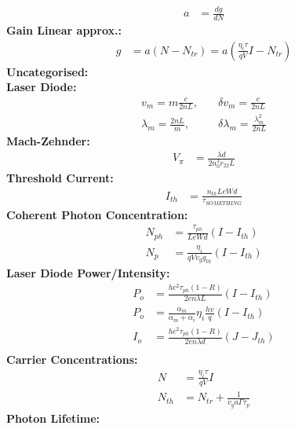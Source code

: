 \documentclass[landscape,a4paper,8pt]{article}
\begin{document}
\begin{multicols}{4}
\begin{align}
		a &= \frac{dg}{dN}
	\end{align}
	\hspace{3mm}\textbf{Gain Linear approx.:}
	\begin{align}
		g &= a(N - N_{tr}) = a\left( \frac{\eta_i\tau}{qV}I - N_{tr} \right)
	\end{align}
	\textbf{Uncategorised:}\\
	\hspace{3mm}\textbf{Laser Diode:}
	\begin{align}
		v_m = m\frac{c}{2nL},&\quad\delta v_m = \frac{c}{2nL}\\
		\lambda_m = \frac{2nL}{m},&\quad\delta\lambda_m = \frac{\lambda_m^2}{2nL}
	\end{align}
	\hspace{3mm}\textbf{Mach-Zehnder:}
	\begin{align}
		V_\pi &= \frac{\lambda d}{2 n_0^3 r_{22} L}
	\end{align}
	\hspace{3mm}\textbf{Threshold Current:}
	\begin{align}
		I_{th} &= \frac{n_{th} LeWd}{\tau_{SOMETHING}}
	\end{align}%
	\hspace{3mm}\textbf{Coherent Photon Concentration:}
	\begin{align}
		N_{ph} &= \frac{\tau_{ph}}{LeWd} (I - I_{th})\\
		N_p &= \frac{\eta_i}{qVv_g g_{th}} (I - I_{th})
	\end{align}
	\hspace{3mm}\textbf{Laser Diode Power/Intensity:}
	\begin{align}
		P_o &= \frac{hc^2 \tau_{ph} (1 - R)}{2en\lambda L}(I - I_{th})\\%
		P_o &= \frac{\alpha_m}{\alpha_m + \alpha_i} \eta_i \frac{hv}{q} (I - I_{th})\\
		I_o &= \frac{hc^2 \tau_{ph} (1 - R)}{2en\lambda d}(J - J_{th})\\%
	\end{align}
	\hspace{3mm}\textbf{Carrier Concentrations:}
	\begin{align}
		N &= \frac{\eta_i \tau}{qV}I\\
		N_{th} &= N_{tr} + \frac{1}{v_g a \Gamma \tau_p}
	\end{align}
	\hspace{3mm}\textbf{Photon Lifetime:}
	\begin{align}

\end{align}
\end{multicols}
\end{document}

